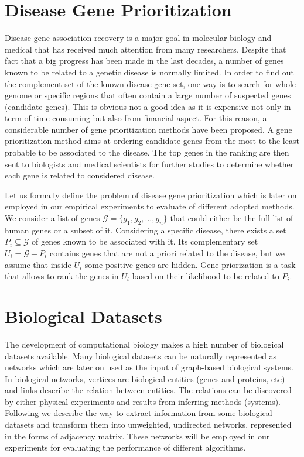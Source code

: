 \section{Disease Gene Prioritization}
Disease-gene association recovery is a major goal in molecular biology and medical that has received much attention from many researchers. Despite that fact that a big progress has been made in the last decades, a number of genes known to be related to a genetic disease is normally limited. In order to find out the complement set of the known disease gene set, one way is to search for whole genome or specific regions that often contain a large number of suspected genes (candidate genes). This is obvious not a good idea as it is expensive not only in term of time consuming but also from financial aspect. For this reason, a considerable number of gene prioritization methods have been proposed. A gene prioritization method aims at ordering candidate genes from the most to the least probable to be associated to the disease. The top genes in the ranking are then sent to biologists and medical scientists for further studies to determine whether each gene is related to considered disease. 

Let us formally define the problem of disease gene prioritization which is later on employed in our empirical experiments to evaluate of different adopted methods. We consider a list of genes $\mathcal{G} = \lbrace g_{1}, g_{2},...,g_{n}\rbrace$ that could either be the full list of human genes or a subset of it. Considering a specific disease, there exists a set $P_{i}\subseteq \mathcal{G}$ of genes known to be associated with it. Its complementary set $U_{i}=\mathcal{G} - P_{i}$ contains genes that are not a priori related to the disease, but we assume that inside $U_i$ some positive genes are hidden. Gene priorization is a task that allows to rank the genes in $U_{i}$ based on their likelihood to be related to $P_{i}$. 

\section{Biological Datasets}
The development of computational biology makes a high number of biological datasets available. Many biological datasets can be naturally represented as networks which are later on used as the input of graph-based biological systems. In biological networks, vertices are biological entities (genes and proteins, etc) and links describe the relation between entities. The relations can be discovered by either physical experiments and results from inferring methods (systems). Following we describe the way to extract information from some biological datasets and transform them into unweighted, undirected networks, represented in the forms of adjacency matrix. These networks will be employed in our experiments for evaluating the performance of different algorithms.

